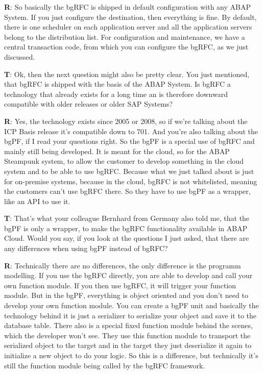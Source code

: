 \begin{list}{X:}{\setlength{\labelsep}{5mm}}
 \item[\textbf{R}:] So basically the bgRFC is shipped in default configuration with any ABAP System. If you just configure the destination, then everything is fine. By default, there is one scheduler on each application server and all the application servers belong to the distribution list. For configuration and maintenance, we have a central transaction code, from which you can configure the bgRFC, as we just discussed.
 \item[\textbf{T}:] Ok, then the next question might also be pretty clear. You just mentioned, that bgRFC is shipped with the basis of the ABAP System. Is bgRFC a technology that already exists for a long time an is therefore downward compatible with older releases or older SAP Systems?
 \item[\textbf{R}:] Yes, the technology exists since 2005 or 2008, so if we're talking about the ICP Basis release it's compatible down to 701. And you're also talking about the bgPF, if I read your questions right. So the bgPF is a special use of bgRFC and mainly still being developed. It is meant for the cloud, so for the ABAP Steampunk system, to allow the customer to develop something in the cloud system and to be able to use bgRFC. Because what we just talked about is just for on-premise systems, because in the cloud, bgRFC is not whitelisted, meaning the customers can't use bgRFC there. So they have to use bgPF as a wrapper, like an API to use it.
 \item[\textbf{T}:] That's what your colleague Bernhard from Germany also told me, that the bgPF is only a wrapper, to make the bgRFC functionality available in ABAP Cloud. Would you say, if you look at the questions I just asked, that there are any differences when using bgPF instead of bgRFC?
 \item[\textbf{R}:] Technically there are no differences, the only difference is the programm modelling. If you use the bgRFC directly, you are able to develop and call your own function module. If you then use bgRFC, it will trigger your function module. But in the bgPF, everything is object oriented and you don't need to develop your own function module. You can create a bgPF unit and basically the technology behind it is just a serializer to serialize your object and save it to the database table. There also is a special fixed function module behind the scenes, which the developer won't see. They use this function module to transport the serialized object to the target and in the target they just deserialize it again to initialize a new object to do your logic. So this is a difference, but technically it's still the function module being called by the bgRFC framework.

\end{list}
